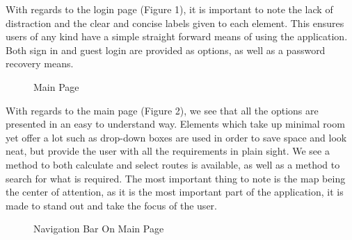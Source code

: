 \documentclass{article}
\begin{document}
				With regards to the login page (Figure 1), it is important to note the lack of distraction and the clear and concise labels given to each element. This ensures users of any kind have a simple straight forward means of using the application. Both sign in and guest login are provided as options, as well as a password recovery means.
			
				\begin{figure}[H]
					
					\caption{Main Page}
				
				\end{figure}

				With regards to the main page (Figure 2), we see that all the options are presented in an easy to understand way. Elements which take up minimal room yet offer a lot such as drop-down boxes are used in order to save space and look neat, but provide the user with all the requirements in plain sight. We see a method to both calculate and select routes is available, as well as a method to search for what is required. The most important thing to note is the map being the center of attention, as it is the most important part of the application, it is made to stand out and take the focus of the user.
			
				\begin{figure}[H]
					
					\caption{Navigation Bar On Main Page}
					
				\end{figure}
			
\end{document}
